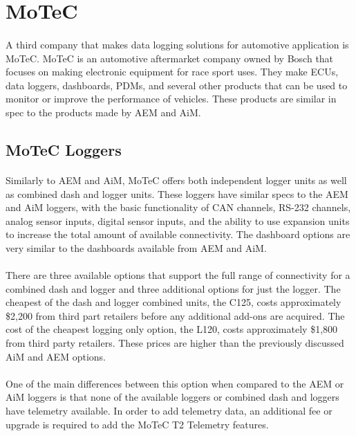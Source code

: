 \section{MoTeC}

\paragraph{}
A third company that makes data logging solutions for automotive application is MoTeC.
MoTeC is an automotive aftermarket company owned by Bosch that focuses on making electronic equipment for race sport uses.
They make ECUs, data loggers, dashboards, PDMs, and several other products that can be used to monitor or improve the performance of vehicles.
These products are similar in spec to the products made by AEM and AiM.

\subsection{MoTeC Loggers}

\paragraph{}
Similarly to AEM and AiM, MoTeC offers both independent logger units as well as combined dash and logger units.
These loggers have similar specs to the AEM and AiM loggers, with the basic functionality of CAN channels, RS-232 channels, analog sensor inputs, digital sensor inputs, and the ability to use expansion units to increase the total amount of available connectivity.
The dashboard options are very similar to the dashboards available from AEM and AiM.

\paragraph{}
There are three available options that support the full range of connectivity for a combined dash and logger and three additional options for just the logger.
The cheapest of the dash and logger combined units, the C125, costs approximately \$2,200 from third part retailers before any additional add-ons are acquired.
The cost of the cheapest logging only option, the L120, costs approximately \$1,800 from third party retailers.
These prices are higher than the previously discussed AiM and AEM options.

\paragraph{}
One of the main differences between this option when compared to the AEM or AiM loggers is that none of the available loggers or combined dash and loggers have telemetry available.
In order to add telemetry data, an additional fee or upgrade is required to add the MoTeC T2 Telemetry features.

